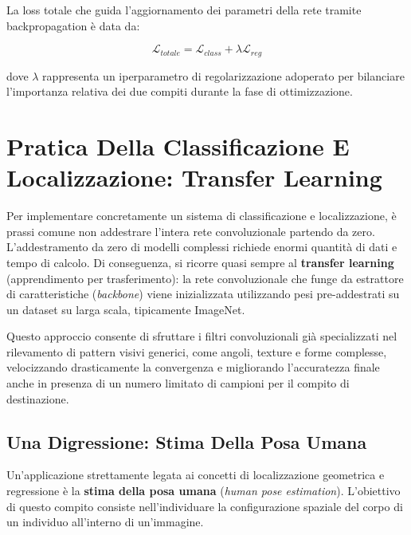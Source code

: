 ﻿\documentclass[11pt, a4paper]{article}
\begin{document}
La loss totale che guida l'aggiornamento dei parametri della rete tramite backpropagation è data da:

\[
\mathcal{L}_{totale} = \mathcal{L}_{class} + \lambda \mathcal{L}_{reg}
\]

dove $\lambda$ rappresenta un iperparametro di regolarizzazione adoperato per bilanciare l'importanza relativa dei due compiti durante la fase di ottimizzazione.

\section{Pratica Della Classificazione E Localizzazione: Transfer Learning}

Per implementare concretamente un sistema di classificazione e localizzazione, è prassi comune non addestrare l'intera rete convoluzionale partendo da zero. L'addestramento da zero di modelli complessi richiede enormi quantità di dati e tempo di calcolo. Di conseguenza, si ricorre quasi sempre al \textbf{transfer learning} (apprendimento per trasferimento): la rete convoluzionale che funge da estrattore di caratteristiche (\emph{backbone}) viene inizializzata utilizzando pesi pre-addestrati su un dataset su larga scala, tipicamente ImageNet.


Questo approccio consente di sfruttare i filtri convoluzionali già specializzati nel rilevamento di pattern visivi generici, come angoli, texture e forme complesse, velocizzando drasticamente la convergenza e migliorando l'accuratezza finale anche in presenza di un numero limitato di campioni per il compito di destinazione.

\subsection{Una Digressione: Stima Della Posa Umana}

Un'applicazione strettamente legata ai concetti di localizzazione geometrica e regressione è la \textbf{stima della posa umana} (\emph{human pose estimation}). L'obiettivo di questo compito consiste nell'individuare la configurazione spaziale del corpo di un individuo all'interno di un'immagine.

\end{document}
